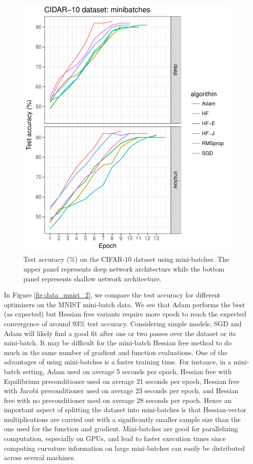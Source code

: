 \documentclass[10pt,twocolumn,letterpaper]{article}
\begin{document}
\begin{figure}
\begin{center}
\includegraphics[scale=0.7]{plot_4.pdf}
\caption{Test accuracy (\%) on the CIFAR-10 dataset using mini-batches. The upper panel represents deep network architecture while the bottom panel represents shallow network architecture.}
\label{fig:datacifar_2}
\end{center}
\end{figure}  

In Figure \ref{fig:data_mnist_2}, we compare the test accuracy for different optimizers on the MNIST mini-batch data. We see that Adam performs the best (as expected) but Hessian free variants require more epoch to reach the expected convergence of around 93\% test accuracy. Considering simple models, SGD and Adam will likely find a good fit after one or two passes over the dataset or its mini-batch. It may be difficult for the mini-batch Hessian free method to do much in the same number of gradient and function evaluations. One of the advantages of using mini-batches is a faster training time. For instance, in a mini-batch setting, Adam used on average 5 seconds per epoch, Hessian free with Equilibrium preconditioner used on average 21 seconds per epoch, Hessian free with Jacobi preconditioner used on average 23 seconds per epoch, and Hessian free with no preconditioner used on average 28 seconds per epoch. Hence an important aspect of splitting the dataset into mini-batches is that Hessian-vector multiplications are carried out with a significantly smaller sample size than the one used for the function and gradient. Mini-batches are good for parallelizing computation, especially on GPUs, and lead to faster execution times since computing curvature information on large mini-batches can easily be distributed across several machines.
\end{document}
